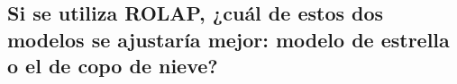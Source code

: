 \medskip
\subsection{Si se utiliza ROLAP, ¿cuál de estos dos modelos se ajustaría mejor: modelo de estrella o el de copo de nieve?}
